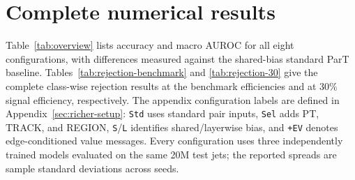 \section{Complete numerical results}
\label{sec:complete-results}

Table~\ref{tab:overview} lists accuracy and macro AUROC for all eight
configurations, with differences measured against the shared-bias standard
ParT baseline. Tables~\ref{tab:rejection-benchmark} and
\ref{tab:rejection-30} give the complete class-wise rejection results at
the benchmark efficiencies and at 30\% signal efficiency, respectively.
The appendix configuration labels are defined in Appendix~\ref{sec:richer-setup}:
\texttt{Std} uses standard pair inputs, \texttt{Sel} adds PT, TRACK, and
REGION, \texttt{S}/\texttt{L} identifies shared/layerwise bias, and
\texttt{+EV} denotes edge-conditioned value messages. Every configuration
uses three independently trained models evaluated on the same 20M test
jets; the reported spreads are sample standard deviations across seeds.


\clearpage

\clearpage


